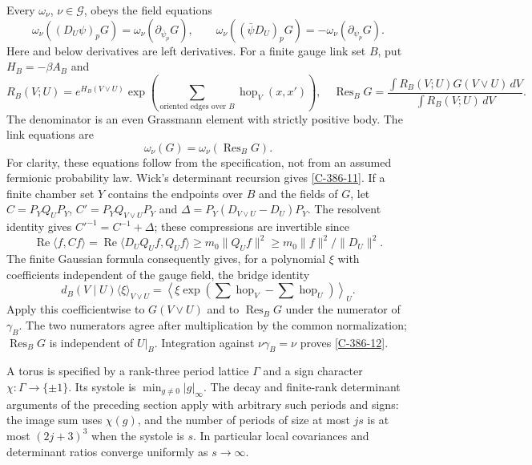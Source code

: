 \documentclass[11pt,letterpaper,reqno]{amsart}
\theoremstyle{definition}
\theoremstyle{remark}
\begin{document}
Every $\omega_\nu$, $\nu\in\mathcal G$, obeys the field equations
\begin{equation}\label{C-386-11}
 \omega_\nu((D_U\psi)_pG)=\omega_\nu(\partial_{\bar\psi_p}G),
 \qquad
 \omega_\nu((\bar\psi D_U)_pG)=-\omega_\nu(\partial_{\psi_p}G).
\end{equation}
Here and below derivatives are left derivatives. For a finite gauge
link set $B$, put $H_B=-\beta A_B$ and
\[
 R_B(V;U)=e^{H_B(V\vee U)}
             \exp\left(\sum_{\text{oriented edges over }B}
                                \operatorname{hop}_{V}(x,x')\right),
 \quad
 \operatorname{Res}_BG=
 \frac{\int R_B(V;U)G(V\vee U)\,dV}{\int R_B(V;U)\,dV}.
\]
The denominator is an even Grassmann element with strictly positive
body. The link equations are
\begin{equation}\label{C-386-12}
                         \omega_\nu(G)=\omega_\nu(\operatorname{Res}_BG).
\end{equation}
For clarity, these equations follow from the specification, not from
an assumed fermionic probability law. Wick's determinant recursion
gives \eqref{C-386-11}. If a finite chamber set $Y$ contains the
endpoints over $B$ and the fields of $G$, let
$C=P_YQ_UP_Y$, $C'=P_YQ_{V\vee U}P_Y$ and
$\Delta=P_Y(D_{V\vee U}-D_U)P_Y$. The resolvent identity gives
$C'^{-1}=C^{-1}+\Delta$; these compressions are invertible since
\[
 \operatorname{Re}\langle f,Cf\rangle
      =\operatorname{Re}\langle D_UQ_Uf,Q_Uf\rangle
      \ge m_0\|Q_Uf\|^2\ge m_0\|f\|^2/\|D_U\|^2.
\]
The finite Gaussian formula consequently gives, for a polynomial
$\xi$ with coefficients independent of the gauge field, the bridge identity
\begin{equation}\label{eq:qcd-gaussian-bridge}
 d_B(V\mid U)\langle \xi\rangle_{V\vee U}
 =\left\langle \xi\exp\left(
       \sum\operatorname{hop}_{V}-\sum\operatorname{hop}_{U}\right)
                                                    \right\rangle_U.
\end{equation}
Apply this coefficientwise to $G(V\vee U)$ and to
$\operatorname{Res}_BG$ under the
numerator of $\gamma_B$. The two numerators agree after multiplication
by the common normalization; $\operatorname{Res}_BG$ is independent
of $U|_B$. Integration against $\nu\gamma_B=\nu$ proves
\eqref{C-386-12}.

A torus is specified by a rank-three period lattice $\Gamma$ and
a sign character $\chi:\Gamma\to\{\pm1\}$. Its systole is
$\min_{g\ne0}|g|_\infty$. The decay and finite-rank determinant
arguments of the preceding section apply with arbitrary such
periods and signs: the image sum uses $\chi(g)$, and the number
of periods of size at most $js$ is at most $(2j+3)^3$ when the
systole is $s$. In particular local covariances and determinant
ratios converge uniformly as $s\to\infty$.
\end{document}
